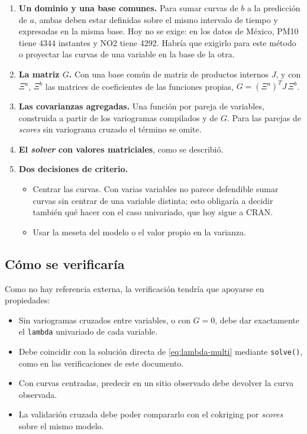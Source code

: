 \documentclass[11pt,a4paper]{article}
\newcommand{\code}[1]{\texttt{#1}}
\begin{document}
\begin{enumerate}
  \item \textbf{Un dominio y una base comunes.} Para sumar curvas de $b$ a la
        predicción de $a$, ambas deben estar definidas sobre el mismo
        intervalo de tiempo y expresadas en la misma base. Hoy no se exige:
        en los datos de México, PM10 tiene 4344 instantes y NO2 tiene 4292.
        Habría que exigirlo para este método o proyectar las curvas de una
        variable en la base de la otra.
  \item \textbf{La matriz $G$.} Con una base común de matriz de productos
        internos $J$, y con $\Xi^{a}$, $\Xi^{b}$ las matrices de coeficientes
        de las funciones propias, $G = (\Xi^{a})^{T} J\, \Xi^{b}$.
  \item \textbf{Las covarianzas agregadas.} Una función por pareja de
        variables, construida a partir de los variogramas compilados y de
        $G$. Para las parejas de \emph{scores} sin variograma cruzado el
        término se omite.
  \item \textbf{El \emph{solver} con valores matriciales}, como se describió.
  \item \textbf{Dos decisiones de criterio.}
        \begin{itemize}
          \item Centrar las curvas. Con varias variables no parece
                defendible sumar curvas sin centrar de una variable distinta;
                esto obligaría a decidir también qué hacer con el caso
                univariado, que hoy sigue a CRAN.
          \item Usar la meseta del modelo o el valor propio en la varianza.
        \end{itemize}
\end{enumerate}

\subsection{Cómo se verificaría}

Como no hay referencia externa, la verificación tendría que apoyarse en
propiedades:
\begin{itemize}
  \item Sin variogramas cruzados entre variables, o con $G = 0$, debe dar
        exactamente el \code{lambda} univariado de cada variable.
  \item Debe coincidir con la solución directa de \eqref{eq:lambda-multi}
        mediante \code{solve()}, como en las verificaciones de este
        documento.
  \item Con curvas centradas, predecir en un sitio observado debe devolver la
        curva observada.
  \item La validación cruzada debe poder compararlo con el cokriging por
        \emph{scores} sobre el mismo modelo.
\end{itemize}
\end{document}
